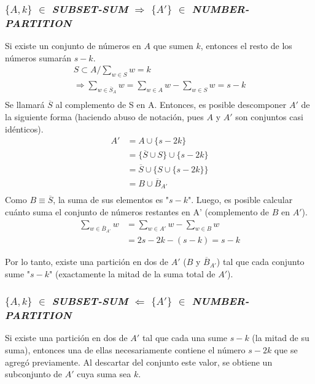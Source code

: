 \subsubsection{$\{A,k\}$ $\in $ \textit{SUBSET-SUM} $\Rightarrow$ $\{A'\}$ $\in$ \textit{NUMBER-PARTITION}}
 Si existe un conjunto de números en $A$ que sumen $k$, entonces el resto de los números sumarán $s-k$. 
\begin{gather*}
    S \subset A  / \sum_{w \in S} w = k \\
    \Rightarrow \sum_{w \in \overline{S}_{A}} w = \sum_{w \in A} w - \sum_{w \in S}w = s - k\\
\end{gather*}
Se llamará $\overline{S}$ al complemento de S en A. Entonces, es posible descomponer $A'$ de la siguiente forma (haciendo abuso de notación, pues $A$ y $A'$ son conjuntos casi idénticos).
    \begin{equation*}
    \begin{split}
        A' &= A \cup  \{s-2k\} \\
            &= \{\overline{S} \cup S\} \cup \{s-2k\} \\
            &= \overline{S}  \cup \{ S \cup \{s-2k\}\} \\
            &= B \cup \overline{B}_{A'}\\\              
    \end{split}
    \end{equation*}
Como $B \equiv \overline{S}$, la suma de sus elementos es "$s-k$". Luego, es posible calcular cuánto suma el conjunto de números restantes en A' (complemento de $B$ en $A'$).
    \begin{equation*}
    \begin{split}
    \sum_{w \in \overline{B}_{A'}} w & = \sum_{w \in A'} w - \sum_{w \in B} w \\
                            & =  2s-2k - (s-k) = s - k
    \end{split}
    \end{equation*}
    
Por lo tanto, existe una partición en dos de $A'$ ($B$ y $\overline{B}_{A'}$) tal que cada conjunto sume "$s-k$" (exactamente la mitad de la suma total de $A'$). 

\subsubsection{$\{A,k\}$ $\in $ \textit{SUBSET-SUM} $\Leftarrow$ $\{A'\}$ $\in$ \textit{NUMBER-PARTITION}} 
Si existe una partición en dos de $A'$ tal que cada una sume $s-k$ (la mitad de su suma), entonces una de ellas necesariamente contiene el número $s-2k$ que se agregó previamente. Al descartar del conjunto este valor, se obtiene un subconjunto de $A'$ cuya suma sea $k$.

